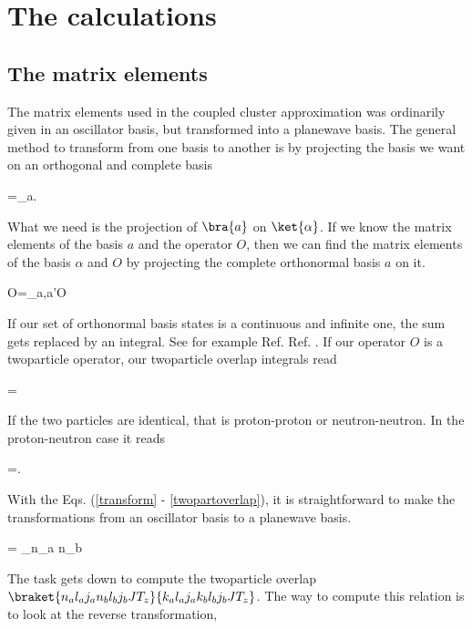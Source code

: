 \chapter{The calculations} 
\section{The matrix elements}
The matrix elements used in the coupled cluster approximation was ordinarily given in an oscillator basis, but
transformed into a planewave basis. The general method to transform from one basis to another is by projecting the basis we want on an orthogonal and 
complete basis

\be
\ket{\alpha}=\sum_a.
\label{transform}
\ee

What we need is the projection of $\bra{a}$ on $\ket{\alpha}$. If we know the matrix elements of the basis $a$ and the operator $O$, then we can find the
matrix elements of the basis $\alpha$ and $O$ by projecting the complete orthonormal basis $a$ on it. 

\be
\bra{\alpha}O=\sum_{a,a'}O
\ee


If our set of orthonormal basis states is a continuous and infinite one, the sum gets replaced by an integral. See for example Ref. Ref. \cite{gamow}.
If our operator $O$ is a twoparticle operator, our twoparticle overlap integrals read 

\be
{}= 
\ee

If the two particles are identical, that is proton-proton or neutron-neutron. In the proton-neutron case it reads

\be
{}=.
\label{twopartoverlap}
\ee

With the Eqs. (\ref{transform} - \ref{twopartoverlap}), it is straightforward to make the transformations from an oscillator basis to a planewave basis. 

\be
{} = \sum_{n_a n_b} 
\ee
 
The task gets down to compute the twoparticle overlap $\braket{n_a l_a j_a n_b l_b j_b J T_z}{k_a l_a j_a k_b l_b j_b J T_z}$. The way to compute this relation is to look at the reverse transformation,

